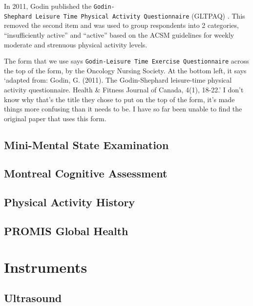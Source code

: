 \documentclass[
]{book}
\begin{document}
In 2011, Godin published the \texttt{Godin-Shephard\ Leisure\ Time\ Physical\ Activity\ Questionnaire} (GLTPAQ) \citep{godinshepherd11}. This removed the second item and was used to group respondents into 2 categories, ``insufficiently active'' and ``active'' based on the ACSM guidelines for weekly moderate and strenuous physical activity levels.

The form that we use says \texttt{Godin-Leisure\ Time\ Exercise\ Questionnaire} across the top of the form, by the Oncology Nursing Society. At the bottom left, it says `adapted from: Godin, G. (2011). The Godin-Shephard leisure-time physical activity questionnaire. Health \& Fitness Journal of Canada, 4(1), 18-22.' I don't know why that's the title they chose to put on the top of the form, it's made things more confusing than it needs to be. I have so far been unable to find the original paper that uses this form.

\hypertarget{Appendix-Surveys-mmse}{%
\section{Mini-Mental State Examination}\label{Appendix-Surveys-mmse}}

\hypertarget{Appendix-Surveys-moca}{%
\section{Montreal Cognitive Assessment}\label{Appendix-Surveys-moca}}

\hypertarget{Appendix-Surveys-pah}{%
\section{Physical Activity History}\label{Appendix-Surveys-pah}}

\hypertarget{Appendix-Surveys-promis}{%
\section{PROMIS Global Health}\label{Appendix-Surveys-promis}}

\hypertarget{Instruments}{%
\chapter{Instruments}\label{Instruments}}

\hypertarget{Appendix-Instruments-Ultrasound}{%
\section{Ultrasound}\label{Appendix-Instruments-Ultrasound}}
\end{document}
